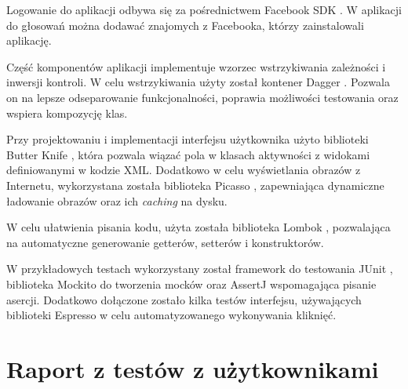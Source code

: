 \documentclass[10pt,a4paper]{article}
\begin{document}
Logowanie do aplikacji odbywa się za pośrednictwem Facebook SDK \cite{facebook-sdk}.
W aplikacji do głosowań można dodawać znajomych z Facebooka, którzy zainstalowali aplikację.

Część komponentów aplikacji implementuje wzorzec wstrzykiwania zależności i inwersji kontroli.
W celu wstrzykiwania użyty został kontener Dagger \cite{dagger}.
Pozwala on na lepsze odseparowanie funkcjonalności, poprawia możliwości testowania oraz wspiera
kompozycję klas.

Przy projektowaniu i implementacji interfejsu użytkownika użyto biblioteki Butter Knife
\cite{butterknife}, która pozwala wiązać pola w klasach aktywności z widokami definiowanymi
w kodzie XML.
Dodatkowo w celu wyświetlania obrazów z Internetu, wykorzystana została biblioteka Picasso
\cite{picasso}, zapewniająca dynamiczne ładowanie obrazów oraz ich \emph{caching} na dysku.

W celu ułatwienia pisania kodu, użyta została biblioteka Lombok \cite{lombok}, pozwalająca
na automatyczne generowanie getterów, setterów i konstruktorów.

W przykładowych testach wykorzystany został framework do testowania JUnit \cite{junit},
biblioteka Mockito \cite{mockito} do tworzenia mocków oraz AssertJ \cite{assertj} wspomagająca
pisanie asercji.
Dodatkowo dołączone zostało kilka testów interfejsu, używających biblioteki Espresso \cite{espresso}
w celu automatyzowanego wykonywania kliknięć.

\section{Raport z testów z użytkownikami}
\end{document}
